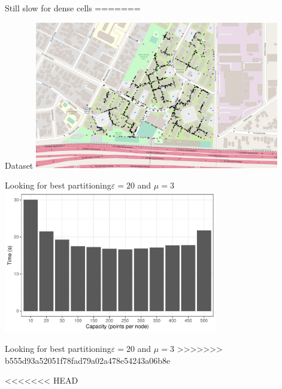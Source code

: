 \documentclass{beamer}
\begin{document}
\begin{frame}{Still slow for dense cells}
=======
\begin{frame}{Dataset}
    \centering
    \includegraphics[width=0.8\textwidth]{figures/dataset}
\end{frame}

\begin{frame}{Looking for best partitioning}{$\varepsilon=20$ and $\mu=3$}
    \centering
    \includegraphics[width=0.7\textwidth]{figures/Capacity/capacity}
\end{frame}

\begin{frame}{Looking for best partitioning}{$\varepsilon=20$ and $\mu=3$}
>>>>>>> b555d93a52051f78fad79a02a478e54243a06b8e
        \centering
<<<<<<< HEAD
\end{frame}



\end{frame}
\end{document}
